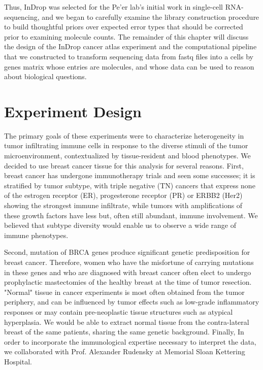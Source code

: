 Thus, InDrop was selected for the Pe’er lab’s initial work in single-cell RNA-sequencing, and we began to carefully examine the library construction procedure to build thoughtful priors over expected error types that should be corrected prior to examining molecule counts. 
The remainder of this chapter will discuss the design of the InDrop cancer atlas experiment and the computational pipeline that we constructed to transform sequencing data from fastq files into a cells by genes matrix whose entries are molecules, and whose data can be used to reason about biological questions. 

\section{Experiment Design}

The primary goals of these experiments were to characterize heterogeneity in tumor infiltrating immune cells in response to the diverse stimuli of the tumor microenvironment, contextualized by tissue-resident and blood phenotypes. 
We decided to use breast cancer tissue for this analysis for several reasons.
First, breast cancer has undergone immunotherapy trials and seen some successes; it is stratified by tumor subtype, with triple negative (TN) cancers that express none of the estrogen receptor (ER), progesterone receptor (PR) or ERBB2 (Her2) showing the strongest immune infiltrate, while tumors with amplifications of these growth factors have less but, often still abundant, immune involvement.
We believed that subtype diversity would enable us to observe a wide range of immune phenotypes. 

Second, mutation of BRCA genes produce significant genetic predisposition for breast cancer.
Therefore, women who have the misfortune of carrying mutations in these genes and who are diagnosed with breast cancer often elect to undergo prophylactic mastectomies of the healthy breast at the time of tumor resection. 
"Normal" tissue in cancer experiments is most often obtained from the tumor periphery, and can be influenced by tumor effects such as low-grade inflammatory responses or may contain pre-neoplastic tissue structures such as atypical hyperplasia. 
We would be able to extract normal tissue from the contra-lateral breast of the same patients, sharing the same genetic background. 
Finally, In order to incorporate the immunological expertise necessary to interpret the data, we collaborated with Prof. Alexander Rudensky at Memorial Sloan Kettering Hospital.

